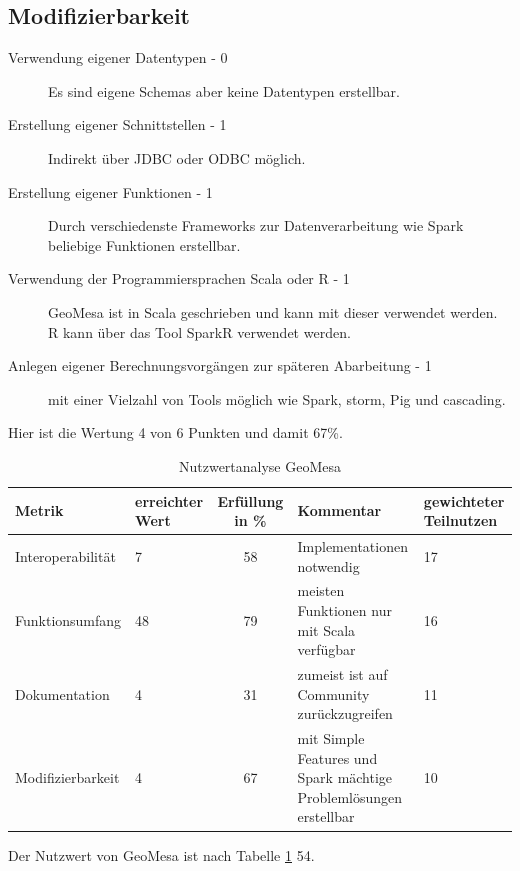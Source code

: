 \subsection{Modifizierbarkeit}
\begin{description}
\item[Verwendung eigener Datentypen - 0] Es sind eigene Schemas aber keine Datentypen erstellbar. \cite{website:geomesa-simplefeatures}
\item[Erstellung eigener Schnittstellen - 1] Indirekt über JDBC oder ODBC möglich.
\item[Erstellung eigener Funktionen - 1] Durch verschiedenste Frameworks zur Datenverarbeitung wie Spark beliebige Funktionen erstellbar.
\item[Verwendung der Programmiersprachen Scala oder R - 1] GeoMesa ist in Scala geschrieben und kann mit dieser verwendet werden. R kann über das Tool SparkR verwendet werden.
\item[Anlegen eigener Berechnungsvorgängen zur späteren Abarbeitung - 1] mit einer Vielzahl von Tools möglich wie Spark, \Gls{storm}, Pig und \Gls{cascading}.
\end{description}
Hier ist die Wertung 4 von 6 Punkten und damit 67\%.

\begin{table}[h!]
\centering
\small
\begin{tabular}{l|p{1.8cm}|c|p{3.1cm}|p{1.8cm}}
\textbf{Metrik} & \textbf{erreichter Wert} & \textbf{Erfüllung in \%} & \textbf{Kommentar} & \textbf{gewichteter Teilnutzen} \\ \hline
Interoperabilität & 7 & 58 & Implementationen notwendig & 17 \\ \hline
Funktionsumfang & 48 & 79 & meisten Funktionen nur mit Scala verfügbar & 16 \\ \hline
Dokumentation & 4 & 31 & zumeist ist auf Community zurückzugreifen & 11 \\ \hline
Modifizierbarkeit & 4 & 67 & mit Simple Features und Spark mächtige Problemlösungen erstellbar & 10 \\
\end{tabular}
\caption{Nutzwertanalyse GeoMesa}
\label{table:nutzwertanalyse-geomesa}
\end{table}
Der Nutzwert von GeoMesa ist nach Tabelle \ref{table:nutzwertanalyse-geomesa} 54.



